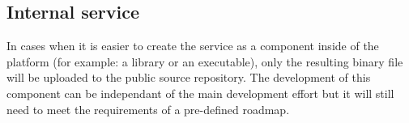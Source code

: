 \subsection{Internal service}
\label{sec:internal-service}

In cases when it is easier to create the service as a component inside of the \learnpad platform
(for example: a library or an executable), only the resulting binary file will be uploaded to the
public source repository. The development of this component can be independant of the main
development effort but it will still need to meet the requirements of a pre-defined roadmap.

